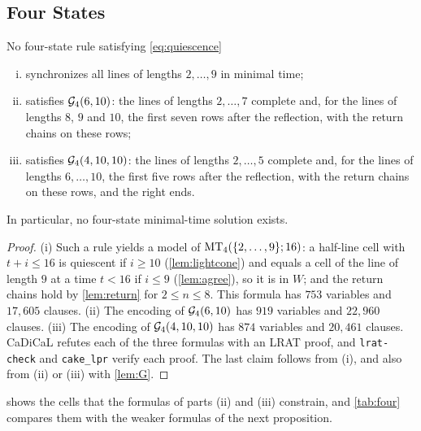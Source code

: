 \subsection{Four States}\label{sec:four}

\begin{theorem}\label{thm:four}
No four-state rule satisfying \eqref{eq:quiescence}
\begin{enumerate}[(i)]
\item synchronizes all lines of lengths $2,\dots,9$ in minimal time;
\item satisfies $\mathcal G_4(6,10)$: the lines of lengths $2,\dots,7$ complete and,
for the lines of lengths $8$, $9$ and $10$, the first seven rows after the
reflection, with the return chains on these rows;
\item satisfies $\mathcal G_4(4,10,10)$: the lines of lengths $2,\dots,5$ complete and,
for the lines of lengths $6,\dots,10$, the first five rows after the reflection,
with the return chains on these rows, and the right ends.
\end{enumerate}
In particular, no four-state minimal-time solution exists.
\end{theorem}

\begin{proof}
(i) Such a rule yields a model of $\mathrm{MT}_4(\{2,\dots,9\};16)$: a half-line cell
with $t+i\le16$ is quiescent if $i\ge10$ (\cref{lem:lightcone}) and equals a
cell of the line of length $9$ at a time $t<16$ if $i\le9$ (\cref{lem:agree}),
so it is in $W$; and the return chains hold by \cref{lem:return} for $2\le
n\le8$. This formula has $753$ variables and $17{,}605$ clauses. (ii) The
encoding of $\mathcal G_4(6,10)$ has $919$ variables and $22{,}960$ clauses. (iii) The
encoding of $\mathcal G_4(4,10,10)$ has $874$ variables and $20{,}461$ clauses. CaDiCaL
refutes each of the three formulas with an LRAT proof, and \texttt{lrat-check}
and \texttt{cake\_lpr} verify each proof. The last claim follows from (i), and also from (ii) or
(iii) with \cref{lem:G}.
\end{proof}

 shows the cells that the formulas of parts (ii) and (iii)
constrain, and \cref{tab:four} compares them with the weaker formulas of the
next proposition.

\begin{table}[t]
\centering\small
\caption{The four-state formulas of \cref{thm:four,prop:sharp}. The columns
(G1), (G2), (G3) and (G5) list the lengths $n$ to which each condition of
\cref{def:G} is applied and, for (G2) and (G3), the relative times $\tau\le T$
up to which they are imposed; every formula $\G_4$ also contains (G4). Every
unsatisfiability is certified by an LRAT proof that \texttt{lrat-check} and
\texttt{cake\_lpr} verify, and every satisfiable formula has a model that is re-simulated. The
labels (i)--(iii) refer to the parts of \cref{thm:four}, and (a), (b) to those
of \cref{prop:sharp}; the first row is the exhaustive enumeration of part (a),
which also finds no partial rule for the lengths $2,\dots,9$.}
\label{tab:four}
\setlength{\tabcolsep}{4.5pt}

\end{table}

